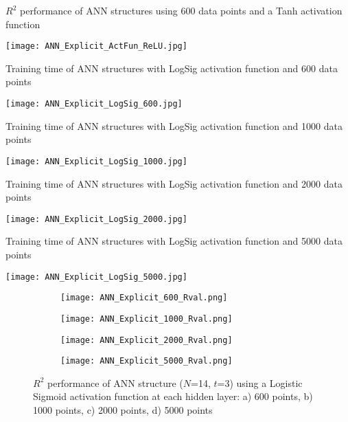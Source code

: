 \begin{table}
	\caption{$R^2$ performance of ANN structures using 600 data points and a Tanh activation function}
	\label{ReLU_table}
	\texttt{[image: ANN\_Explicit\_ActFun\_ReLU.jpg]}
\end{table}

\begin{table}
	\caption{Training time of ANN structures with LogSig activation function and 600 data points}
	\label{ANN_Explicit_LogSig_600_table}
	\texttt{[image: ANN\_Explicit\_LogSig\_600.jpg]}
\end{table}

\begin{table}
	\caption{Training time of ANN structures with LogSig activation function and 1000 data points}
	\label{ANN_Explicit_LogSig_1000_table}
	\texttt{[image: ANN\_Explicit\_LogSig\_1000.jpg]}
\end{table}

\begin{table}
	\caption{Training time of ANN structures with LogSig activation function and 2000 data points}
	\label{ANN_Explicit_LogSig_2000_table}
	\texttt{[image: ANN\_Explicit\_LogSig\_2000.jpg]}
\end{table}

\begin{table}
	\caption{Training time of ANN structures with LogSig activation function and 5000 data points}
	\label{ANN_Explicit_LogSig_5000_table}
	\texttt{[image: ANN\_Explicit\_LogSig\_5000.jpg]}
\end{table}

\begin{figure}
	\centering
	\begin{subfigure}[b]{0.49\textwidth}
		\centering
		\texttt{[image: ANN\_Explicit\_600\_Rval.png]}
		\caption{}
		\label{600_Rval}
	\end{subfigure}
	\hfill
	\begin{subfigure}[b]{0.49\textwidth}
		\centering
		\texttt{[image: ANN\_Explicit\_1000\_Rval.png]}
		\caption{}
		\label{1000_Rval}
	\end{subfigure}
	\hfill
	\begin{subfigure}[b]{0.49\textwidth}
		\centering
		\texttt{[image: ANN\_Explicit\_2000\_Rval.png]}
		\caption{}
		\label{2000_Rval}
	\end{subfigure}
	\hfill
	\begin{subfigure}[b]{0.49\textwidth}
		\centering
		\texttt{[image: ANN\_Explicit\_5000\_Rval.png]}
		\caption{}
		\label{5000_Rval}
	\end{subfigure}
	\caption{$R^2$ performance of ANN structure ($N$=14, $t$=3) using a Logistic Sigmoid activation function at each hidden layer: a) 600 points, b) 1000 points, c) 2000 points, d) 5000 points}
	\label{$R^2$ performance of ANN structure}
\end{figure}


